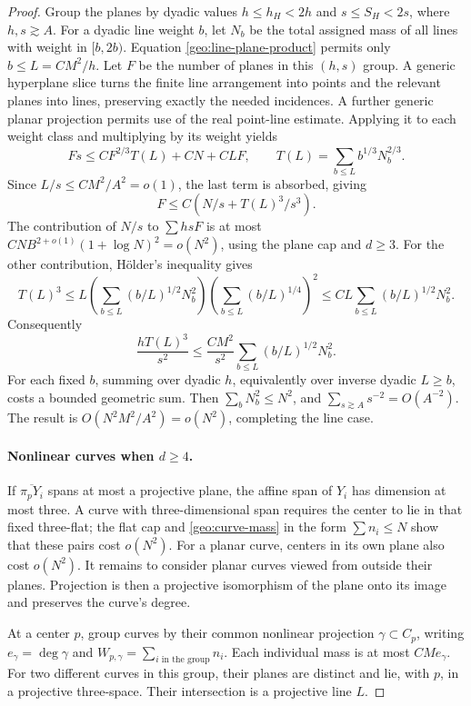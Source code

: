 \begin{proof}
Group the planes by dyadic values
$h\le h_H<2h$ and $s\le S_H<2s$, where $h,s\gtrsim A$.
For a dyadic line weight $b$, let $N_b$ be the total assigned mass
of all lines with weight in $[b,2b)$. Equation
\eqref{geo:line-plane-product} permits only $b\le L=CM^2/h$.
Let $F$ be the number of planes in this $(h,s)$ group.
A generic hyperplane slice turns the finite line arrangement into
points and the relevant planes into lines, preserving exactly the
needed incidences. A further generic planar projection permits use
of the real point-line estimate. Applying it to each weight class
and multiplying by its weight yields
\[
 Fs\le C F^{2/3}T(L)+CN+CLF,
 \qquad T(L)=\sum_{b\le L}b^{1/3}N_b^{2/3}.
\]
Since $L/s\le CM^2/A^2=o(1)$, the last term is absorbed, giving
\begin{equation}\label{geo:weighted-plane-count}
 F\le C\left(N/s+T(L)^3/s^3\right).
\end{equation}
The contribution of $N/s$ to $\sum hsF$ is at most
$CN B^{2+o(1)}(1+\log N)^2=o(N^2)$, using the plane cap and $d\ge3$.
For the other contribution, H\"older's inequality gives
\[
 T(L)^3\le
 L\left(\sum_{b\le L}(b/L)^{1/2}N_b^2\right)
   \left(\sum_{b\le L}(b/L)^{1/4}\right)^2
 \le C L\sum_{b\le L}(b/L)^{1/2}N_b^2.
\]
Consequently
\[
 \frac{hT(L)^3}{s^2}
 \le\frac{CM^2}{s^2}
       \sum_{b\le L}(b/L)^{1/2}N_b^2.
\]
For each fixed $b$, summing over dyadic $h$, equivalently over inverse
dyadic $L\ge b$, costs a bounded geometric sum. Then
$\sum_bN_b^2\le N^2$, and $\sum_{s\gtrsim A}s^{-2}=O(A^{-2})$.
The result is $O(N^2M^2/A^2)=o(N^2)$, completing the line case.

\paragraph{Nonlinear curves when $d\ge4$.}
If $\overline{\pi_pY_i}$ spans at most a projective plane, the affine
span of $Y_i$ has dimension at most three. A curve with three-dimensional
span requires the center to lie in that fixed three-flat; the flat cap
and \eqref{geo:curve-mass} in the form $\sum n_i\le N$ show that these
pairs cost $o(N^2)$. For a planar curve, centers in its own plane also
cost $o(N^2)$. It remains to consider planar curves viewed from outside
their planes. Projection is then a projective isomorphism of the plane
onto its image and preserves the curve's degree.

At a center $p$, group curves by their common nonlinear projection
$\gamma\subset C_p$, writing $e_\gamma=\deg\gamma$ and
$W_{p,\gamma}=\sum_{i\text{ in the group}}n_i$.
Each individual mass is at most $CMe_\gamma$.
For two different curves in this group, their planes are distinct and
lie, with $p$, in a projective three-space. Their intersection is a
projective line $L$.


\end{proof}
